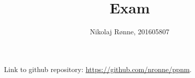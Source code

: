 \documentclass{article}
\title{Exam}
\author{Nikolaj R\o nne, 201605807}
\begin{document}
\maketitle

\noindent
Link to github repository: \url{https://github.com/nronne/ppnm}.
\end{document}
